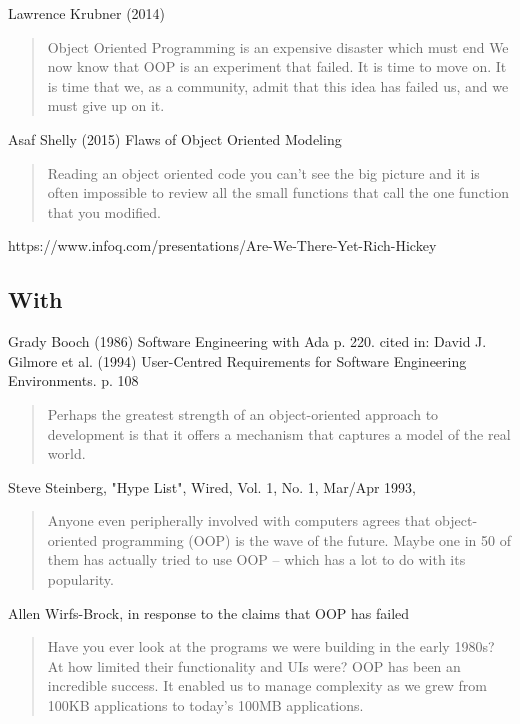 \documentclass[12pt]{book}
\begin{document}
Lawrence Krubner (2014)
\begin{quote}
	Object Oriented Programming is an expensive disaster which must end
	We now know that OOP is an experiment that failed. It is time to move on. It is time that we, as a community, admit that this idea has failed us, and we must give up on it.
\end{quote}

Asaf Shelly (2015)
Flaws of Object Oriented Modeling
\begin{quote}
	Reading an object oriented code you can't see the big picture and it is often impossible to review all the small functions that call the one function that you modified.
\end{quote}


https://www.infoq.com/presentations/Are-We-There-Yet-Rich-Hickey


\subsection{With}

Grady Booch (1986) Software Engineering with Ada p. 220. cited in: David J. Gilmore et al. (1994) User-Centred Requirements for Software Engineering Environments. p. 108
\begin{quote}
	Perhaps the greatest strength of an object-oriented approach to development is that it offers a mechanism that captures a model of the real world.
\end{quote}

Steve Steinberg, "Hype List", Wired, Vol. 1, No. 1, Mar/Apr 1993,
\begin{quote}
	Anyone even peripherally involved with computers agrees that object-oriented programming (OOP) is the wave of the future. Maybe one in 50 of them has actually tried to use OOP – which has a lot to do with its popularity.
\end{quote}

Allen Wirfs-Brock, in response to the claims that OOP has failed
\begin{quote}
	Have you ever look at the programs we were building in the early 1980s? At how limited their functionality and UIs were? OOP has been an incredible success. It enabled us to manage complexity as we grew from 100KB applications to today’s 100MB applications.
\end{quote}



\ifx\wholebook\relax\else
% 
% 
	
\end{document}
